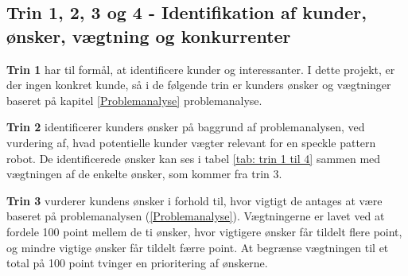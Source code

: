 \subsection{Trin 1, 2, 3 og 4 - Identifikation af kunder, ønsker, vægtning og konkurrenter} \label{Trin 1-4}

\textbf{Trin 1} har til formål, at identificere kunder og interessanter. I dette projekt, er der ingen konkret kunde, så i de følgende trin er kunders ønsker og vægtninger baseret på kapitel \ref{Problemanalyse} problemanalyse. 
 
\textbf{Trin 2} identificerer kunders ønsker på baggrund af problemanalysen, ved vurdering af, hvad potentielle kunder vægter relevant for en speckle pattern robot. De identificerede ønsker kan ses i tabel \ref{tab: trin 1 til 4} sammen med vægtningen af de enkelte ønsker, som kommer fra trin 3. 

\textbf{Trin 3} vurderer kundens ønsker i forhold til, hvor vigtigt de antages at være baseret på problemanalysen (\ref{Problemanalyse}). Vægtningerne er lavet ved at fordele 100 point mellem de ti ønsker, hvor vigtigere ønsker får tildelt flere point, og mindre vigtige ønsker får tildelt færre point. At begrænse vægtningen til et total på 100 point tvinger en prioritering af ønskerne. 

